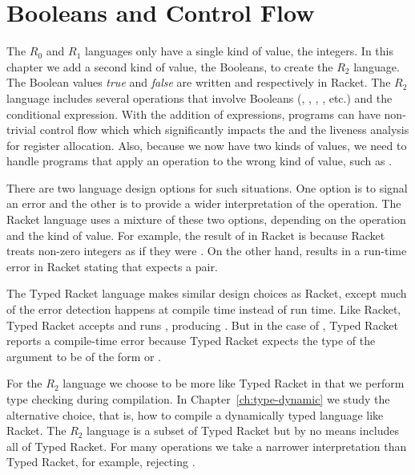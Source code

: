 \documentclass[11pt]{book}
\begin{document}
\chapter{Booleans and Control Flow}
\label{ch:bool-types}

The $R_0$ and $R_1$ languages only have a single kind of value, the
integers. In this chapter we add a second kind of value, the Booleans,
to create the $R_2$ language. The Boolean values \emph{true} and
\emph{false} are written  and  respectively in
Racket.  The $R_2$ language includes several operations that involve
Booleans (, , , \key{<}, etc.) and the
conditional  expression. With the addition of 
expressions, programs can have non-trivial control flow which which
significantly impacts the  and the liveness
analysis for register allocation. Also, because we now have two kinds
of values, we need to handle programs that apply an operation to the
wrong kind of value, such as .

There are two language design options for such situations.  One option
is to signal an error and the other is to provide a wider
interpretation of the operation. The Racket language uses a mixture of
these two options, depending on the operation and the kind of
value. For example, the result of  in Racket is
 because Racket treats non-zero integers as if they were
. On the other hand,  results in a run-time
error in Racket stating that  expects a pair.

The Typed Racket language makes similar design choices as Racket,
except much of the error detection happens at compile time instead of
run time. Like Racket, Typed Racket accepts and runs ,
producing . But in the case of , Typed Racket
reports a compile-time error because Typed Racket expects the type of
the argument to be of the form  or .

For the $R_2$ language we choose to be more like Typed Racket in that
we perform type checking during compilation. In
Chapter~\ref{ch:type-dynamic} we study the alternative choice, that
is, how to compile a dynamically typed language like Racket.  The
$R_2$ language is a subset of Typed Racket but by no means includes
all of Typed Racket. For many operations we take a narrower
interpretation than Typed Racket, for example, rejecting .
\end{document}
